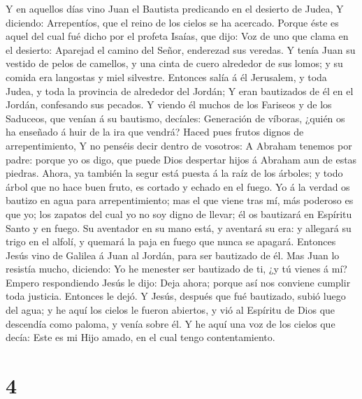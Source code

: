  Y en aquellos días vino Juan el Bautista predicando en el
desierto de Judea,  Y diciendo: Arrepentíos, que el reino
de los cielos se ha acercado.  Porque éste es aquel del
cual fué dicho por el profeta Isaías, que dijo: Voz de uno que clama en
el desierto: Aparejad el camino del Señor, enderezad sus veredas.
 Y tenía Juan su vestido de pelos de camellos, y una cinta
de cuero alrededor de sus lomos; y su comida era langostas y miel
silvestre.  Entonces salía á él Jerusalem, y toda Judea, y
toda la provincia de alrededor del Jordán;  Y eran
bautizados de él en el Jordán, confesando sus pecados.  Y
viendo él muchos de los Fariseos y de los Saduceos, que venían á su
bautismo, decíales: Generación de víboras, ¿quién os ha enseñado á huir
de la ira que vendrá?  Haced pues frutos dignos de
arrepentimiento,  Y no penséis decir dentro de vosotros: A
Abraham tenemos por padre: porque yo os digo, que puede Dios despertar
hijos á Abraham aun de estas piedras.  Ahora, ya también
la segur está puesta á la raíz de los árboles; y todo árbol que no hace
buen fruto, es cortado y echado en el fuego.  Yo á la
verdad os bautizo en agua para arrepentimiento; mas el que viene tras
mí, más poderoso es que yo; los zapatos del cual yo no soy digno de
llevar; él os bautizará en Espíritu Santo y en fuego.  Su
aventador en su mano está, y aventará su era: y allegará su trigo en el
alfolí, y quemará la paja en fuego que nunca se apagará. 
Entonces Jesús vino de Galilea á Juan al Jordán, para ser bautizado de
él.  Mas Juan lo resistía mucho, diciendo: Yo he menester
ser bautizado de ti, ¿y tú vienes á mí?  Empero
respondiendo Jesús le dijo: Deja ahora; porque así nos conviene cumplir
toda justicia. Entonces le dejó.  Y Jesús, después que
fué bautizado, subió luego del agua; y he aquí los cielos le fueron
abiertos, y vió al Espíritu de Dios que descendía como paloma, y venía
sobre él.  Y he aquí una voz de los cielos que decía:
Este es mi Hijo amado, en el cual tengo contentamiento.

\hypertarget{section-3}{%
\section{4}\label{section-3}}

